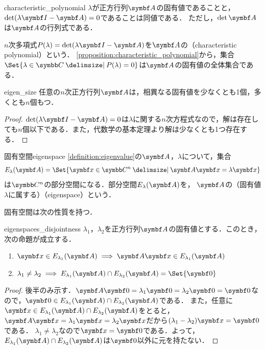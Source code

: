 \documentclass[../../main]{subfiles}
\begin{document}
\begin{proposition}{}{characteristic_polynomial}
  \(\lambda\)が正方行列\(\mat{A}\)の固有値であることと，\(\det(\lambda\imat-\mat{A})=0\)であることは同値である．
  ただし，\(\det\mat{A}\)は\(\mat{A}\)の行列式である．
\end{proposition}

\(n\)次多項式\(P(\lambda)=\det(\lambda\imat-\mat{A})\)を\(\mat{A}\)の（characteristic polynomial）という．
\cref{proposition:characteristic_polynomial}から，集合\(\Set{\lambda\in\numset{C}\given P(\lambda)=0}\)は\(\mat{A}\)の固有値の全体集合である．

\begin{corollary}{}{eigen_size}
  任意の\(n\)次正方行列\(\mat{A}\)は，相異なる固有値を少なくとも1個，多くとも\(n\)個もつ．
\end{corollary}
\begin{proof}
  \(\det(\lambda\imat-\mat{A})=0\)は\(\lambda\)に関する\(n\)次方程式なので，解は存在しても\(n\)個以下である．また，代数学の基本定理より解は少なくとも1つ存在する．
\end{proof}

\begin{definition}{固有空間}{eigenspace}
  \cref{definition:eigenvalue}の\(\mat{A}\)，\(\lambda\)について，集合
  \[
    E_\lambda(\mat{A}) = \Set{\vect{x}\in\numset{C}^n\given\mat{A}\vect{x}=\lambda\vect{x}}
  \]
  は\(\numset{C}^n\)の部分空間になる．部分空間\(E_\lambda(\mat{A})\)を，
  \(\mat{A}\)の（固有値\(\lambda\)に属する）（eigenspace）という．
\end{definition}

固有空間は次の性質を持つ．

\begin{proposition}{}{eigenspaces_disjointness}
  \(\lambda_1\)，\(\lambda_2\)を正方行列\(\mat{A}\)の固有値とする．このとき，次の命題が成立する．
  \begin{enumerate}
    \item \(\vect{x}\in E_{\lambda_1}(\mat{A})\implies\mat{A}\vect{x}\in E_{\lambda_1}(\mat{A})\)
    \item \(\lambda_1\neq\lambda_2\implies E_{\lambda_1}(\mat{A})\cap E_{\lambda_2}(\mat{A})=\Set{\zvec}\)
  \end{enumerate}
\end{proposition}
\begin{proof}
  後半のみ示す．\(\mat{A}\zvec=\lambda_1\zvec=\lambda_2\zvec=\zvec\)なので，\(\zvec\in E_{\lambda_1}(\mat{A})\cap E_{\lambda_2}(\mat{A})\)である．
  また，任意に\(\vect{x}\in E_{\lambda_1}(\mat{A})\cap E_{\lambda_2}(\mat{A})\)をとると，\(\mat{A}\vect{x}=\lambda_1\vect{x}=\lambda_2\vect{x}\)だから\((\lambda_1-\lambda_2)\vect{x}=\zvec\)である．
  \(\lambda_1\neq\lambda_2\)なので\(\vect{x}=\zvec\)である．よって，\(E_{\lambda_1}(\mat{A})\cap E_{\lambda_2}(\mat{A})\)は\(\zvec\)以外に元を持たない．
\end{proof}
\end{document}
